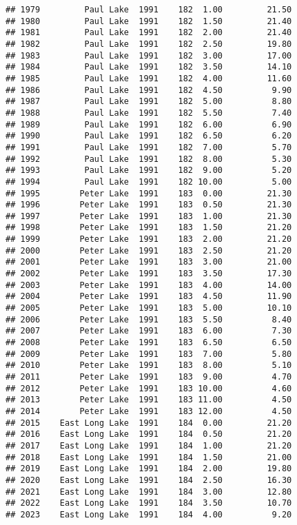 \documentclass[
]{article}
\begin{document}
\begin{verbatim}
## 1979         Paul Lake  1991    182  1.00         21.50
## 1980         Paul Lake  1991    182  1.50         21.40
## 1981         Paul Lake  1991    182  2.00         21.40
## 1982         Paul Lake  1991    182  2.50         19.80
## 1983         Paul Lake  1991    182  3.00         17.00
## 1984         Paul Lake  1991    182  3.50         14.10
## 1985         Paul Lake  1991    182  4.00         11.60
## 1986         Paul Lake  1991    182  4.50          9.90
## 1987         Paul Lake  1991    182  5.00          8.80
## 1988         Paul Lake  1991    182  5.50          7.40
## 1989         Paul Lake  1991    182  6.00          6.90
## 1990         Paul Lake  1991    182  6.50          6.20
## 1991         Paul Lake  1991    182  7.00          5.70
## 1992         Paul Lake  1991    182  8.00          5.30
## 1993         Paul Lake  1991    182  9.00          5.20
## 1994         Paul Lake  1991    182 10.00          5.00
## 1995        Peter Lake  1991    183  0.00         21.30
## 1996        Peter Lake  1991    183  0.50         21.30
## 1997        Peter Lake  1991    183  1.00         21.30
## 1998        Peter Lake  1991    183  1.50         21.20
## 1999        Peter Lake  1991    183  2.00         21.20
## 2000        Peter Lake  1991    183  2.50         21.20
## 2001        Peter Lake  1991    183  3.00         21.00
## 2002        Peter Lake  1991    183  3.50         17.30
## 2003        Peter Lake  1991    183  4.00         14.00
## 2004        Peter Lake  1991    183  4.50         11.90
## 2005        Peter Lake  1991    183  5.00         10.10
## 2006        Peter Lake  1991    183  5.50          8.40
## 2007        Peter Lake  1991    183  6.00          7.30
## 2008        Peter Lake  1991    183  6.50          6.50
## 2009        Peter Lake  1991    183  7.00          5.80
## 2010        Peter Lake  1991    183  8.00          5.10
## 2011        Peter Lake  1991    183  9.00          4.70
## 2012        Peter Lake  1991    183 10.00          4.60
## 2013        Peter Lake  1991    183 11.00          4.50
## 2014        Peter Lake  1991    183 12.00          4.50
## 2015    East Long Lake  1991    184  0.00         21.20
## 2016    East Long Lake  1991    184  0.50         21.20
## 2017    East Long Lake  1991    184  1.00         21.20
## 2018    East Long Lake  1991    184  1.50         21.00
## 2019    East Long Lake  1991    184  2.00         19.80
## 2020    East Long Lake  1991    184  2.50         16.30
## 2021    East Long Lake  1991    184  3.00         12.80
## 2022    East Long Lake  1991    184  3.50         10.70
## 2023    East Long Lake  1991    184  4.00          9.20

\end{verbatim}
\end{document}
